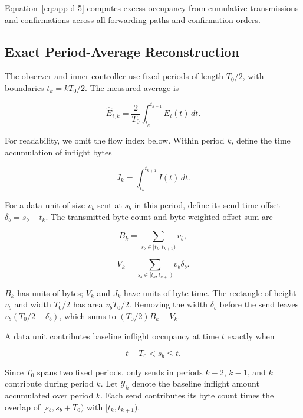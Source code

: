 Equation~\eqref{eq:app-d-5} computes excess occupancy from cumulative transmissions and confirmations across all forwarding paths and confirmation orders.

\subsection{Exact Period-Average Reconstruction}
\label{app:d-2}

The observer and inner controller use fixed periods of length \(T_0/2\), with boundaries \(t_k=kT_0/2\). The measured average is

\begin{equation}
\label{eq:app-d-7}
\widehat E_{i,k}
=\frac{2}{T_0}\int_{t_k}^{t_{k+1}}E_i(t)\,dt.
\end{equation}

For readability, we omit the flow index below. Within period \(k\), define the time accumulation of inflight bytes

\begin{equation}
\label{eq:app-d-8}
J_k=\int_{t_k}^{t_{k+1}}I(t)\,dt.
\end{equation}

For a data unit of size \(v_b\) sent at \(s_b\) in this period, define its send-time offset \(\delta_b=s_b-t_k\). The transmitted-byte count and byte-weighted offset sum are

\begin{equation}
\label{eq:app-d-9}
B_k=\sum_{s_b\in[t_k,t_{k+1})}v_b,
\end{equation}

\begin{equation}
\label{eq:app-d-10}
V_k=\sum_{s_b\in[t_k,t_{k+1})}v_b\delta_b.
\end{equation}

\(B_k\) has units of bytes; \(V_k\) and \(J_k\) have units of byte-time. The rectangle of height \(v_b\) and width \(T_0/2\) has area \(v_bT_0/2\). Removing the width \(\delta_b\) before the send leaves \(v_b(T_0/2-\delta_b)\), which sums to \((T_0/2)B_k-V_k\).

A data unit contributes baseline inflight occupancy at time \(t\) exactly when

\begin{equation}
\label{eq:app-d-11}
t-T_0<s_b\le t.
\end{equation}

Since \(T_0\) spans two fixed periods, only sends in periods \(k-2\), \(k-1\), and \(k\) contribute during period \(k\). Let \(\mathcal Y_k\) denote the baseline inflight amount accumulated over period \(k\). Each send contributes its byte count times the overlap of \([s_b,s_b+T_0)\) with \([t_k,t_{k+1})\).

